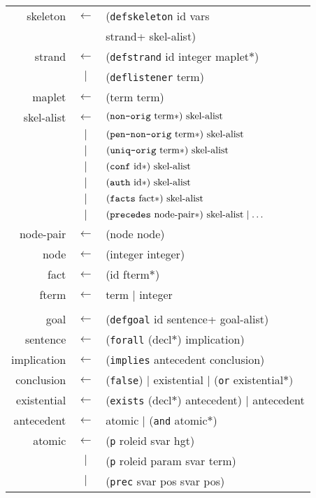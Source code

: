 \begin{table}
\newcommand{\sym}[1]{\textup{\texttt{#1}}}
\begin{center}\scshape
\begin{tabular}{rcl}
   skeleton&$\leftarrow$&
(\sym{defskeleton} id vars
\\ &&\qquad strand+ skel-alist)
\\ strand&$\leftarrow$&
(\sym{defstrand} id integer maplet$\ast$)
\\ &$\mid$&(\sym{deflistener} term)
\\ maplet&$\leftarrow$&
(term term)
\\ skel-alist&$\leftarrow$&$(\sym{non-orig}\mbox{ term}\ast)\mbox{ skel-alist}$
\\ &$\mid$&$(\sym{pen-non-orig}\mbox{ term}\ast)\mbox{ skel-alist}$
\\ &$\mid$&$(\sym{uniq-orig}\mbox{ term}\ast)\mbox{ skel-alist}$
\\ &$\mid$&$(\sym{conf}\mbox{ id}\ast)\mbox{ skel-alist}$
\\ &$\mid$&$(\sym{auth}\mbox{ id}\ast)\mbox{ skel-alist}$
\\ &$\mid$&$(\sym{facts}\mbox{ fact$\ast$})\mbox{ skel-alist}$
\\ &$\mid$&$(\sym{precedes}\mbox{ node-pair}\ast)\mbox{ skel-alist}\mid\ldots$
\\ node-pair&$\leftarrow$&
(node node)
\\ node&$\leftarrow$&
(integer integer)
\\ fact&$\leftarrow$&(id fterm$\ast$)
\\ fterm&$\leftarrow$&term $\mid$ integer
\\
\\ goal&$\leftarrow$&
(\sym{defgoal} id sentence+ goal-alist)
\\ sentence&$\leftarrow$&(\sym{forall} (decl$\ast$) implication)
\\ implication&$\leftarrow$&
(\sym{implies} \mbox{antecedent} \mbox{conclusion})
\\ conclusion&$\leftarrow$&(\sym{false})
   $\mid$ existential $\mid$ (\sym{or} existential$\ast)$
\\ existential&$\leftarrow$&(\sym{exists}
(decl$\ast$) antecedent) $\mid$ antecedent
\\ antecedent&$\leftarrow$& atomic $\mid$ (\sym{and} atomic$\ast$)
\\ atomic&$\leftarrow$&(\sym{p} roleid svar hgt)
\\ &$\mid$&(\sym{p} roleid param svar term)
\\ &$\mid$&(\sym{prec} svar pos svar pos)

\end{tabular}
\end{center}
\end{table}
